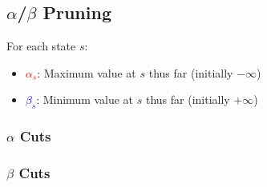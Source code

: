 \subsection{$\alpha$/$\beta$ Pruning}
\begin{definition}
    For each state $s$: 
    \begin{itemize}
        \item \textcolor{red}{$\alpha_s$}: Maximum value at $s$ thus far (initially $-\infty$)
        \item \textcolor{blue}{$\beta_s$}: Minimum value at $s$ thus far (initially $+\infty$)
    \end{itemize}
\end{definition}

\subsubsection{$\alpha$ Cuts}
\begin{notes}
\end{notes}

\subsubsection{$\beta$ Cuts}
\begin{notes}
\end{notes}
\newpage

